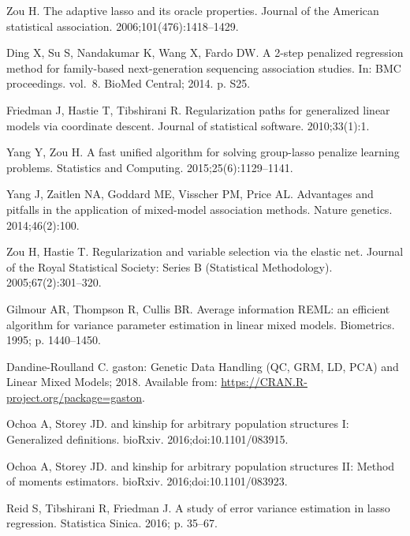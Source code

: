 \documentclass[10pt,letterpaper]{article}
\begin{document}
\begin{thebibliography}{10}
	Zou H.
	\newblock The adaptive lasso and its oracle properties.
	\newblock Journal of the American statistical association.
	2006;101(476):1418--1429.

	Ding X, Su S, Nandakumar K, Wang X, Fardo DW.
	\newblock A 2-step penalized regression method for family-based next-generation
	sequencing association studies.
	\newblock In: BMC proceedings. vol.~8. BioMed Central; 2014. p. S25.

	Friedman J, Hastie T, Tibshirani R.
	\newblock Regularization paths for generalized linear models via coordinate
	descent.
	\newblock Journal of statistical software. 2010;33(1):1.

	Yang Y, Zou H.
	\newblock A fast unified algorithm for solving group-lasso penalize learning
	problems.
	\newblock Statistics and Computing. 2015;25(6):1129--1141.

	Yang J, Zaitlen NA, Goddard ME, Visscher PM, Price AL.
	\newblock Advantages and pitfalls in the application of mixed-model association
	methods.
	\newblock Nature genetics. 2014;46(2):100.

	Zou H, Hastie T.
	\newblock Regularization and variable selection via the elastic net.
	\newblock Journal of the Royal Statistical Society: Series B (Statistical
	Methodology). 2005;67(2):301--320.

	Gilmour AR, Thompson R, Cullis BR.
	\newblock Average information REML: an efficient algorithm for variance
	parameter estimation in linear mixed models.
	\newblock Biometrics. 1995; p. 1440--1450.

	Dandine-Roulland C. gaston: Genetic Data Handling (QC, GRM, LD, PCA) and Linear
	Mixed Models; 2018.
	\newblock Available from: \url{https://CRAN.R-project.org/package=gaston}.

	Ochoa A, Storey JD.
	 and kinship for arbitrary population structures {I}:
	Generalized definitions.
	\newblock bioRxiv. 2016;doi:{10.1101/083915}.

	Ochoa A, Storey JD.
	 and kinship for arbitrary population structures {II}: Method of
	moments estimators.
	\newblock bioRxiv. 2016;doi:{10.1101/083923}.

	Reid S, Tibshirani R, Friedman J.
	\newblock A study of error variance estimation in lasso regression.
	\newblock Statistica Sinica. 2016; p. 35--67.


\end{thebibliography}
\end{document}
